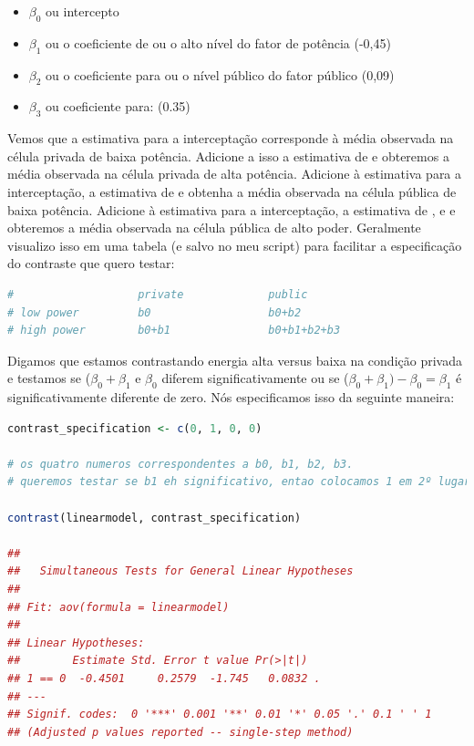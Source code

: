 \documentclass{article}
\begin{document}
\begin{itemize}
    \item $\beta_{0}$ ou intercepto
    \item $\beta_{1}$ ou o coeficiente de  ou o alto nível do fator de potência (-0,45)
    \item $\beta_{2}$ ou o coeficiente para  ou o nível público do fator público (0,09)
    \item $\beta_{3}$ ou coeficiente para:  (0.35)
\end{itemize}


Vemos que a estimativa para a interceptação corresponde à média observada na célula privada de baixa potência. Adicione a isso a estimativa de  e obteremos a média observada na célula privada de alta potência. Adicione à estimativa para a interceptação, a estimativa de  e obtenha a média observada na célula pública de baixa potência. Adicione à estimativa para a interceptação, a estimativa de ,  e  e obteremos a média observada na célula pública de alto poder. Geralmente visualizo isso em uma tabela (e salvo no meu script) para facilitar a especificação do contraste que quero testar:

\begin{lstlisting}[language=R]
#                   private             public
# low power         b0                  b0+b2
# high power        b0+b1               b0+b1+b2+b3
\end{lstlisting}

Digamos que estamos contrastando energia alta versus baixa na condição privada e testamos se ($\beta_{0}+\beta_{1}$ e $\beta_{0}$ diferem significativamente ou se ($\beta_{0}+\beta_{1})-\beta_{0}=\beta_{1}$ é significativamente diferente de zero. Nós especificamos isso da seguinte maneira:

\begin{lstlisting}[language=R]
contrast_specification <- c(0, 1, 0, 0) 

# os quatro numeros correspondentes a b0, b1, b2, b3. 
# queremos testar se b1 eh significativo, entao colocamos 1 em 2º lugar (o 1º lugar é para b0)

contrast(linearmodel, contrast_specification)

## 
##   Simultaneous Tests for General Linear Hypotheses
## 
## Fit: aov(formula = linearmodel)
## 
## Linear Hypotheses:
##        Estimate Std. Error t value Pr(>|t|)  
## 1 == 0  -0.4501     0.2579  -1.745   0.0832 .
## ---
## Signif. codes:  0 '***' 0.001 '**' 0.01 '*' 0.05 '.' 0.1 ' ' 1
## (Adjusted p values reported -- single-step method)
\end{lstlisting}
\end{document}
